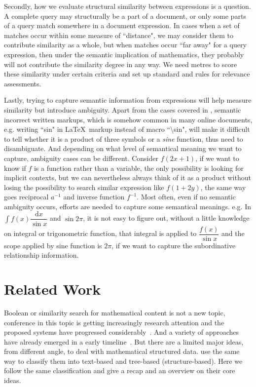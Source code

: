 Secondly, how we evaluate structural similarity between expressions is a question. A complete query may structurally be a part of a document, or only some parts of a query match somewhere in a document expression.
In cases when a set of matches occur within some measure of ``distance", we may consider them to contribute similarity as a whole, but when matches occur ``far away" for a query expression, then under the semantic implication of mathematics, they probably will not contribute the similarity degree in any way.
We need metres to score these similarity under certain criteria and set up standard and rules for relevance assessments. 

Lastly, trying to capture semantic information from expressions will help measure similarity but introduce ambiguity. 
Apart from the cases covered in \cite{parsing_tex}, semantic incorrect written markups, which is somehow common in many online documents, e.g. writing ``sin" in \LaTeX\ markup instead of macro ``\textbackslash sin", will make it difficult to tell whether it is a product of three symbols or a \textit{sine} function, thus need to disambiguate. 
And depending on what level of semantical meaning we want to capture, ambiguity cases can be different. 
Consider $f(2x+1)$, if we want to know if $f$ is a function rather than a variable, the only possibility is looking for implicit contexts, but we can nevertheless always think of it as a product without losing the possibility to search similar expression like $f(1 + 2y)$, the same way goes reciprocal $a^{-1}$ and inverse function $f^{-1}$. 
Most often, even if no semantic ambiguity occurs, efforts are needed to capture some semantical meanings. e.g. In $\displaystyle\int f(x) \dfrac{\mathrm{d}x}{\sin x}$ and $\sin 2 \pi$, it is not easy to figure out, without a little knowledge on integral or trigonometric function, that integral is applied to $\dfrac {f(x)} {\sin x}$ and the scope applied by sine function is $2 \pi$, if we want to capture the subordinative relationship information.


\section{Related Work}
Boolean or similarity search for mathematical content is not a new topic, conference in this topic is getting increasingly research attention and the proposed systems have progressed considerably~\cite{ov}. 
And a variety of approaches have already emerged in a early timeline~\cite{egomath13}.
But there are a limited major ideas, from different angle, to deal with mathematical structured data. \cite{WikiMirs13,symbolpairs15,Youssef14} use the same way to classify them into text-based and tree-based (structure-based). Here we follow the same classification and give a recap and an overview on their core ideas.

